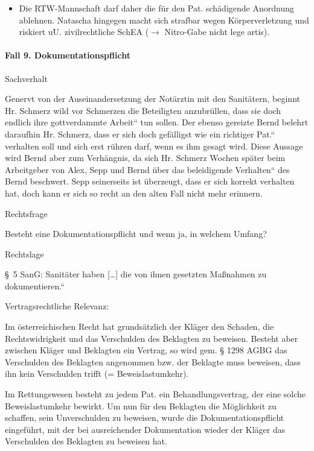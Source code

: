 \documentclass{article}
\begin{document}
\begin{itemize}
\item Die RTW-Mannschaft darf daher die f\"ur den Pat. sch\"adigende
Anordnung ablehnen. Natascha hingegen macht sich strafbar wegen
K\"orperverletzung und riskiert uU. zivilrechtliche SchEA
(${\rightarrow}$ Nitro-Gabe nicht lege artis).

\end{itemize}
\paragraph{Fall 9. Dokumentationspflicht}
Sachverhalt

Genervt von der Auseinandersetzung der Not\"arztin mit den Sanit\"atern,
beginnt Hr. Schmerz wild vor Schmerzen die Beteiligten anzubr\"ullen,
dass sie doch endlich ihre {\quotedblbase}gottverdammte
Arbeit{\textquotedblleft} tun sollen. Der ebenso gereizte Bernd belehrt
daraufhin Hr. Schmerz, dass er sich doch gef\"alligst wie ein
{\quotedblbase}richtiger Pat.{\textquotedblleft} verhalten soll und
sich erst r\"uhren darf, wenn es ihm gesagt wird. Diese Aussage wird
Bernd aber zum Verh\"angnis, da sich Hr. Schmerz Wochen sp\"ater beim
Arbeitgeber von Alex, Sepp und Bernd \"uber das
{\quotedblbase}beleidigende Verhalten{\textquotedblleft} des Bernd
beschwert. Sepp seinerseits ist \"uberzeugt, dass er sich korrekt
verhalten hat, doch kann er sich so recht an den alten Fall nicht mehr
erinnern.

Rechtsfrage

Besteht eine Dokumentationspflicht und wenn ja, in welchem Umfang? 

Rechtslage

{\S}~5 SanG: {\quotedblbase}Sanit\"ater haben [{\dots}] die von ihnen
gesetzten Ma{\ss}nahmen zu dokumentieren.{\textquotedblleft}

Vertragsrechtliche Relevanz:

Im \"osterreichischen Recht hat grunds\"atzlich der Kl\"ager den
Schaden, die Rechtswidrigkeit und das Verschulden des Beklagten zu
beweisen. Besteht aber zwischen Kl\"ager und Beklagten ein Vertrag, so
wird gem. {\S} 1298 AGBG das Verschulden des Beklagten angenommen bzw.
der Beklagte muss beweisen, dass ihn kein Verschulden trifft (=
Beweislastumkehr). 

Im Rettungswesen besteht zu jedem Pat. ein Behandlungsvertrag, der eine
solche Beweislastumkehr bewirkt. Um nun f\"ur den Beklagten die
M\"oglichkeit zu schaffen, sein Unverschulden zu beweisen, wurde die
Dokumentationspflicht eingef\"uhrt, mit der bei ausreichender
Dokumentation wieder der Kl\"ager das Verschulden des Beklagten zu
beweisen hat.
\end{document}
